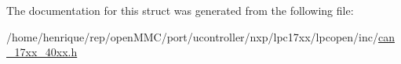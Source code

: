 The documentation for this struct was generated from the following file\-:\begin{DoxyCompactItemize}
\item 
/home/henrique/rep/open\-M\-M\-C/port/ucontroller/nxp/lpc17xx/lpcopen/inc/\hyperlink{can__17xx__40xx_8h}{can\-\_\-17xx\-\_\-40xx.\-h}\end{DoxyCompactItemize}
